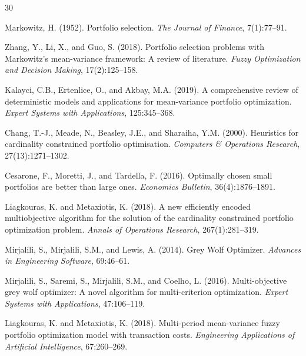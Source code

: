 \documentclass[10pt,twocolumn,a4paper]{article}
\begin{document}

\begin{thebibliography}{30}
\small


Markowitz, H. (1952).
Portfolio selection.
\emph{The Journal of Finance}, 7(1):77--91.

Zhang, Y., Li, X., and Guo, S. (2018).
Portfolio selection problems with Markowitz's mean-variance framework: A review of literature.
\emph{Fuzzy Optimization and Decision Making}, 17(2):125--158.

Kalayci, C.B., Ertenlice, O., and Akbay, M.A. (2019).
A comprehensive review of deterministic models and applications for mean-variance portfolio optimization.
\emph{Expert Systems with Applications}, 125:345--368.

Chang, T.-J., Meade, N., Beasley, J.E., and Sharaiha, Y.M. (2000).
Heuristics for cardinality constrained portfolio optimisation.
\emph{Computers \& Operations Research}, 27(13):1271--1302.

Cesarone, F., Moretti, J., and Tardella, F. (2016).
Optimally chosen small portfolios are better than large ones.
\emph{Economics Bulletin}, 36(4):1876--1891.

Liagkouras, K. and Metaxiotis, K. (2018).
A new efficiently encoded multiobjective algorithm for the solution of the cardinality constrained portfolio optimization problem.
\emph{Annals of Operations Research}, 267(1):281--319.

Mirjalili, S., Mirjalili, S.M., and Lewis, A. (2014).
Grey Wolf Optimizer.
\emph{Advances in Engineering Software}, 69:46--61.

Mirjalili, S., Saremi, S., Mirjalili, S.M., and Coelho, L. (2016).
Multi-objective grey wolf optimizer: A novel algorithm for multi-criterion optimization.
\emph{Expert Systems with Applications}, 47:106--119.

Liagkouras, K. and Metaxiotis, K. (2018).
Multi-period mean-variance fuzzy portfolio optimization model with transaction costs.
\emph{Engineering Applications of Artificial Intelligence}, 67:260--269.


\end{thebibliography}
\end{document}
